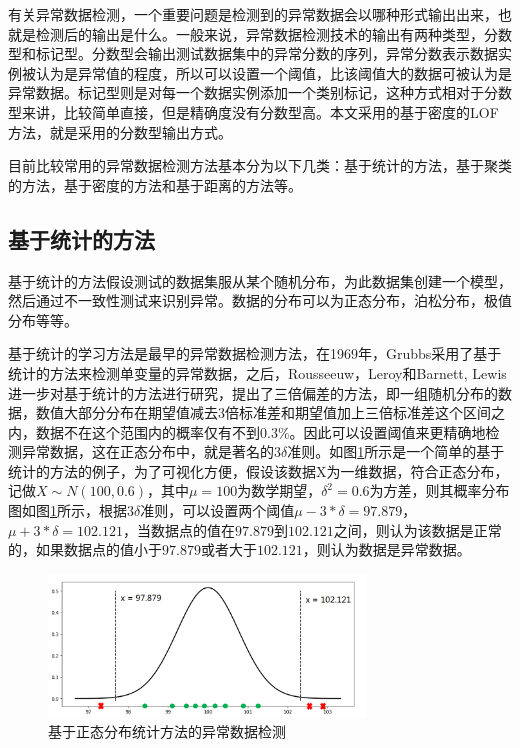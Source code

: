 有关异常数据检测，一个重要问题是检测到的异常数据会以哪种形式输出出来，也就是检测后的输出是什么。一般来说，异常数据检测技术的输出有两种类型，分数型和标记型。分数型会输出测试数据集中的异常分数的序列，异常分数表示数据实例被认为是异常值的程度，所以可以设置一个阈值，比该阈值大的数据可被认为是异常数据。标记型则是对每一个数据实例添加一个类别标记，这种方式相对于分数型来讲，比较简单直接，但是精确度没有分数型高。本文采用的基于密度的LOF方法，就是采用的分数型输出方式。

目前比较常用的异常数据检测方法基本分为以下几类：基于统计的方法，基于聚类的方法，基于密度的方法和基于距离的方法等。
 
\subsection{基于统计的方法}
基于统计的方法假设测试的数据集服从某个随机分布，为此数据集创建一个模型，然后通过不一致性测试来识别异常。数据的分布可以为正态分布，泊松分布，极值分布等等。

基于统计的学习方法是最早的异常数据检测方法，在1969年，Grubbs采用了基于统计的方法来检测单变量的异常数据，之后，Rousseeuw，Leroy和Barnett, Lewis进一步对基于统计的方法进行研究，提出了三倍偏差的方法，即一组随机分布的数据，数值大部分分布在期望值减去3倍标准差和期望值加上三倍标准差这个区间之内，数据不在这个范围内的概率仅有不到$0.3\%$。因此可以设置阈值来更精确地检测异常数据，这在正态分布中，就是著名的$3\delta $准则。如图\ref{fig:fig2}所示是一个简单的基于统计的方法的例子，为了可视化方便，假设该数据X为一维数据，符合正态分布，记做$X\sim N\left(100,0.6 \right) $，其中$\mu = 100$为数学期望，$\delta ^{2}=0.6$为方差，则其概率分布图如图\ref{fig:fig2}所示，根据$3\delta $准则，可以设置两个阈值$\mu -3*\delta =97.879$，$\mu +3*\delta =102.121$，当数据点的值在$97.879$到$102.121$之间，则认为该数据是正常的，如果数据点的值小于$97.879$或者大于$102.121$，则认为数据是异常数据。

\begin{figure}
	\centering
	\includegraphics[width=0.75\textwidth]{figures/figure2x1}
	\caption{基于正态分布统计方法的异常数据检测}\label{fig:fig2}
\end{figure}

